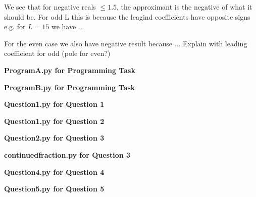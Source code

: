 \documentclass[12pt, a4paper]{article}
\begin{document}
We see that for negative reals $\leq 1.5$, the approximant is the negative of what it should be.
For odd L this is because the leagind coefficients have opposite signs e.g. for $L = 15$ we have ...

For the even case we also have negative result because ...
Explain with leading coeffieient for odd (pole for even?)


\pagebreak
\textbf{Program\textunderscore A.py for Programming Task}\centering\label{Program_A}

\vspace{2cm}

\pagebreak
\textbf{Program\textunderscore B.py for Programming Task}\centering\label{Program_B}

\vspace{2cm}

\pagebreak
\textbf{Question\textunderscore 1.py for Question 1}\centering\label{Question_1}

\vspace{2cm}

\pagebreak
\textbf{Question\textunderscore 1.py for Question 2}\centering\label{Question_2}

\vspace{2cm}

\pagebreak
\textbf{Question\textunderscore 2.py for Question 3}\centering\label{Question_3}

\vspace{2cm}

\pagebreak
\textbf{continued\textunderscore fraction.py for Question 3}\centering\label{continued_fraction}

\vspace{2cm}

\pagebreak
\textbf{Question\textunderscore 4.py for Question 4}\centering\label{Question_4}

\vspace{2cm}

\pagebreak
\textbf{Question\textunderscore 5.py for Question 5}\centering\label{Question_5}

\vspace{2cm}
\end{document}
